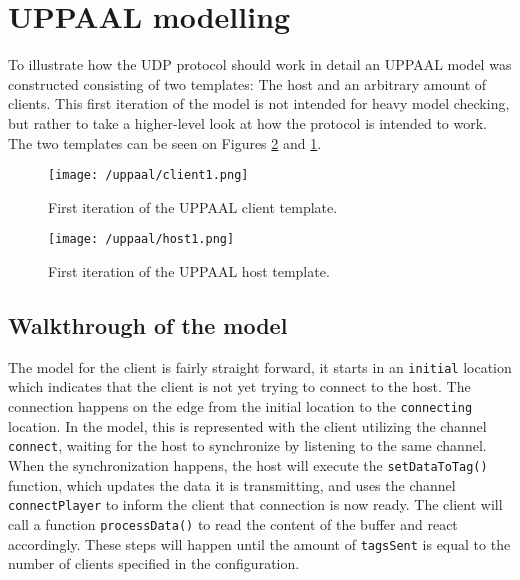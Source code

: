 \section{UPPAAL modelling}
To illustrate how the UDP protocol should work in detail an UPPAAL model was constructed consisting of two templates: The host and an arbitrary amount of clients.
This first iteration of the model is not intended for heavy model checking, but rather to take a higher-level look at how the protocol is intended to work.
The two templates can be seen on Figures \ref{fig:uppaal-host-1} and \ref{fig:uppaal-client-1}.

\begin{figure}[H]
   \centering
    \texttt{[image: /uppaal/client1.png]}
    \caption{First iteration of the UPPAAL client template.}
    \label{fig:uppaal-client-1}
\end{figure}

\begin{figure}[H]
   \centering
    \texttt{[image: /uppaal/host1.png]}
    \caption{First iteration of the UPPAAL host template.}
    \label{fig:uppaal-host-1}
\end{figure}

\subsection{Walkthrough of the model}
The model for the client is fairly straight forward, it starts in an \texttt{initial} location which indicates that the client is not yet trying to connect to the host.
The connection happens on the edge from the initial location to the \texttt{connecting} location.
In the model, this is represented with the client utilizing the channel \texttt{connect}, waiting for the host to synchronize by listening to the same channel.
When the synchronization happens, the host will execute the \texttt{setDataToTag()} function, which updates the data it is transmitting, and uses the channel \texttt{connectPlayer} to inform the client that connection is now ready.
The client will call a function \texttt{processData()} to read the content of the buffer and react accordingly. 
These steps will happen until the amount of \texttt{tagsSent} is equal to the number of clients specified in the configuration.

